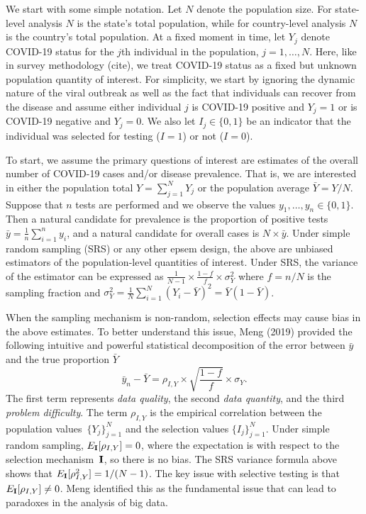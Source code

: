 \documentclass[11pt]{amsart}
\def\I{\bf I}
\begin{document}
We start with some simple notation.  Let $N$ denote the population size.  For state-level analysis $N$ is the state's total population, while for country-level analysis $N$ is the country's total population.  At a fixed moment in time, let $Y_j$ denote COVID-19 status for the $j$th individual in the population, $j=1,\ldots, N$. Here, like in survey methodology (cite), we treat COVID-19 status as a fixed but unknown population quantity of interest. For simplicity, we start by ignoring the dynamic nature of the viral outbreak as well as the fact that individuals can recover from the disease and assume either individual $j$ is COVID-19 positive and $Y_j=1$ or is COVID-19 negative and $Y_j=0$. We also let $I_j \in \{0,1\}$ be an indicator that the individual was selected for testing ($I = 1$) or not ($I=0$).

To start, we assume the primary questions of interest are estimates of the overall number of COVID-19 cases and/or disease prevalence. That is, we are interested in either the population total $Y = \sum_{j=1}^N Y_j$ or the population average $\bar Y = Y/N$. Suppose that $n$ tests are performed and we observe the values $y_1, \ldots, y_n \in \{0,1\}$.  Then a natural candidate for prevalence is the proportion of positive tests $\bar y = \frac{1}{n} \sum_{i=1}^n y_i$, and a natural candidate for overall cases is $N \times \bar y$.
Under simple random sampling (SRS) or any other epsem design, the above are unbiased estimators of the population-level quantities of interest.  Under SRS, the variance of the estimator can be expressed as $\frac{1}{N-1} \times \frac{1-f}{f} \times \sigma_Y^2$ where $f = n/N$ is the sampling fraction and $\sigma_Y^2 = \frac{1}{N} \sum_{i=1}^N (Y_i - \bar Y)^2 = \bar Y (1- \bar Y)$.

When the sampling mechanism is non-random, selection effects may cause bias in the above estimates. To better understand this issue, Meng (2019) provided the following intuitive and powerful statistical decomposition of the error between $\bar y$ and the true proportion $\bar Y$
$$
\bar y_n - \bar Y =  \rho_{I, Y} \times \sqrt{\frac{1-f}{f}} \times \sigma_Y.
$$
The first term represents \emph{data quality}, the second \emph{data quantity}, and the third \emph{problem difficulty}. The term $\rho_{I,Y}$ is the empirical correlation between the population values~$\{ Y_j \}_{j=1}^N$ and the selection values $\{ I_j \}_{j=1}^N$.  Under simple random sampling, $E_{\I} [ \rho_{I,Y} ] = 0$, where the expectation is with respect to the selection mechanism~$\I$, so there is no bias.  The SRS variance formula above shows that $E_{\I} [ \rho_{I,Y}^2 ]  = 1/(N-1)$.  The key issue with selective testing is that $E_{\I} [ \rho_{I,Y} ] \neq 0$.  Meng identified this as the fundamental issue that can lead to paradoxes in the analysis of big data.
\end{document}
